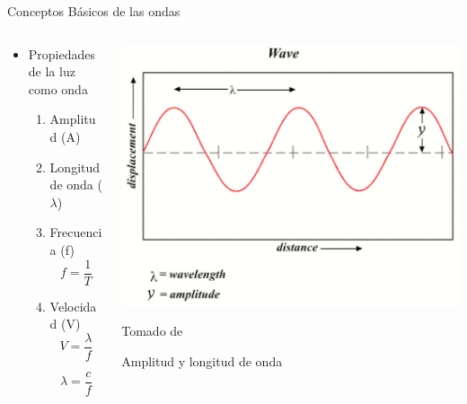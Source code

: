 \documentclass[aspectratio=169]{beamer}
\begin{document}
\begin{frame}{Conceptos Básicos de las ondas}
    \begin{columns}[c, onlytextwidth]
        \begin{column}{0.55\textwidth}
            \begin{itemize}
            \item Propiedades de la luz como onda
            \begin{enumerate}
                \item Amplitud (A)
                \item Longitud de onda ($\lambda$)
                \item Frecuencia (f) 
                \begin{equation*}
                    f=\frac{1}{T}
                \end{equation*}
                \item Velocidad (V)
                \begin{equation*}
                    V=\frac{\lambda}{f}
                \end{equation*}
                
                \begin{equation*}
                    \lambda=\frac{c}{f}
                \end{equation*}
            \end{enumerate}
            
            \end{itemize}
        \end{column}
        \begin{column}{0.45\textwidth}
            \centering
            \centering
            \includegraphics[width = 1\linewidth]{fig/Optica/amplitud.jpg}
            \vspace{0.5cm}
            
            \tiny{Tomado de \cite{Fraden_2016}}
            
            \tiny{Amplitud y longitud de onda}
        \end{column}
    \end{columns}
\end{frame}
\end{document}
